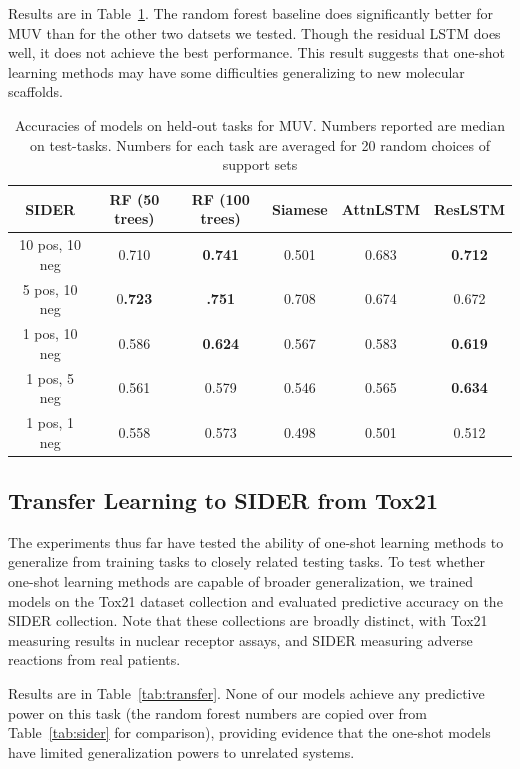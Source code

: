 \documentclass[journal=jacsat,manuscript=article]{achemso}
\begin{document}
Results are in Table~\ref{tab:MUV}. The random forest baseline does significantly better for MUV than for the other two datsets we tested. Though the residual LSTM does well, it does not achieve the best performance. This result suggests that one-shot learning methods may have some difficulties generalizing to new molecular scaffolds.

\begin{table}
    \centering
    \begin{tabular}{ |c|c|c|c|c|c| } 
    \hline
    SIDER & RF (50 trees) & RF (100 trees) & Siamese & AttnLSTM & ResLSTM \\ 
    \hline
    10 pos, 10 neg & 0.710 & \textbf{0.741} & 0.501 & 0.683 & \textbf{0.712} \\
    \hline
    5 pos, 10 neg & 0\textbf{.723} & \textbf{.751} & 0.708 & 0.674 & 0.672 \\ 
    \hline
    1 pos, 10 neg & 0.586 & \textbf{0.624} & 0.567 & 0.583 & \textbf{0.619} \\ 
    \hline
    1 pos, 5 neg & 0.561 & 0.579 & 0.546 & 0.565 & \textbf{0.634} \\ 
    \hline
    1 pos, 1 neg & 0.558 & 0.573 & 0.498 & 0.501 & 0.512 \\ 
    \hline
    \end{tabular}
    \caption{Accuracies of models on held-out tasks for MUV. Numbers reported are median on test-tasks. Numbers for each task are averaged for 20 random choices of support sets}
    \label{tab:MUV}
\end{table}

\subsection{Transfer Learning to SIDER from Tox21}

The experiments thus far have tested the ability of one-shot learning methods to generalize from training tasks to closely related testing tasks. To test whether one-shot learning methods are capable of broader generalization, we trained models on the Tox21 dataset collection and evaluated predictive accuracy on the SIDER collection. Note that these collections are broadly distinct, with Tox21 measuring results in nuclear receptor assays, and SIDER measuring adverse reactions from real patients.

Results are in Table~\ref{tab:transfer}. None of our models achieve any predictive power on this task (the random forest numbers are copied over from Table~\ref{tab:sider} for comparison), providing evidence that the one-shot models have limited generalization powers to unrelated systems.
\end{document}
